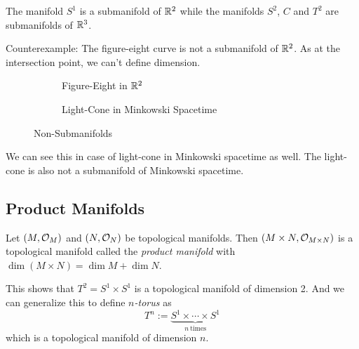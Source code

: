 \begin{example}
	The manifold \(S^1\) is a submanifold of \(\mathbb R^2\) while the manifolds \(S^2\), \(C\) and \(T^2\) are submanifolds of \(\mathbb R^3\).
\end{example}
Counterexample: The figure-eight curve is not a submanifold of \(\mathbb R^2\). As at the intersection point, we can't define dimension.

\begin{figure}[H]
	\centering
	\begin{subfigure}{0.4\textwidth}
		\centering
		\caption{Figure-Eight in \(\mathbb R^2\)}
		\label{fig:figure-eight}
	\end{subfigure}
	\begin{subfigure}{0.4\textwidth}
		\centering
		\caption{Light-Cone in Minkowski Spacetime}
		\label{fig:light-cone}
	\end{subfigure}
	\caption{Non-Submanifolds}
	\label{fig:non-submanifolds}
\end{figure}

We can see this in case of light-cone in Minkowski spacetime as well. The light-cone is also not a submanifold of Minkowski spacetime.

\subsection{Product Manifolds}

\begin{definition}
	Let \((M, \mathcal{O}_M)\) and \((N, \mathcal{O}_N)\) be topological manifolds. Then \((M \times N, \mathcal{O}_{M \times N})\) is a topological manifold called the \emph{product manifold} with \(\dim(M \times N) = \dim{M} + \dim{N}\).
\end{definition}

\begin{example}
	This shows that \(T^2 = S^1 \times S^1\) is a topological manifold of dimension 2. And we can generalize this to define \emph{\(n\)-torus} as
	\begin{equation}
		T^n := \underbrace{S^1 \times \cdots \times S^1}_{n\ \text{times}}
	\end{equation}
	which is a topological manifold of dimension \(n\).
\end{example}

